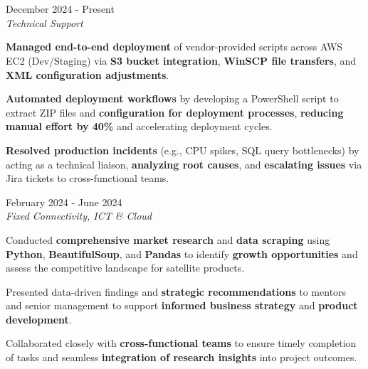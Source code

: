 \documentclass[../main.tex]{subfiles}
\begin{document}
\section{}
\begin{twocolentry}{
		December 2024 - Present
	}
	 \\
	\vspace{0.10 cm}
	\textit{Technical Support}
\end{twocolentry}

\vspace{0.10 cm}
\begin{onecolentry}
	\begin{highlights}
		\item \textbf{Managed end-to-end deployment} of vendor-provided scripts across AWS EC2 (Dev/Staging) via \textbf{S3 bucket integration}, \textbf{WinSCP file transfers}, and \textbf{XML configuration adjustments}.
		\item \textbf{Automated deployment workflows} by developing a PowerShell script to extract ZIP files and \textbf{configuration for deployment processes}, \textbf{reducing manual effort by 40\%} and accelerating deployment cycles.
		\item \textbf{Resolved production incidents} (e.g., CPU spikes, SQL query bottlenecks) by acting as a technical liaison, \textbf{analyzing root causes}, and \textbf{escalating issues} via Jira tickets to cross-functional teams.
	\end{highlights}
\end{onecolentry}


\vspace{0.4 cm}

\begin{twocolentry}{
		February 2024 - June 2024
	}
	 \\
	\vspace{0.10 cm}
	\textit{Fixed Connectivity, ICT \& Cloud}
\end{twocolentry}
\vspace{0.10 cm}
\begin{onecolentry}
	\begin{highlights}
		\item Conducted \textbf{comprehensive market research} and \textbf{data scraping} using \textbf{Python}, \textbf{BeautifulSoup}, and \textbf{Pandas} to identify \textbf{growth opportunities} and assess the competitive landscape for satellite products.
		\item Presented data-driven findings and \textbf{strategic recommendations} to mentors and senior management to support \textbf{informed business strategy} and \textbf{product development}.
		\item Collaborated closely with \textbf{cross-functional teams} to ensure timely completion of tasks and seamless \textbf{integration of research insights} into project outcomes.
	\end{highlights}
\end{onecolentry}
\end{document}
